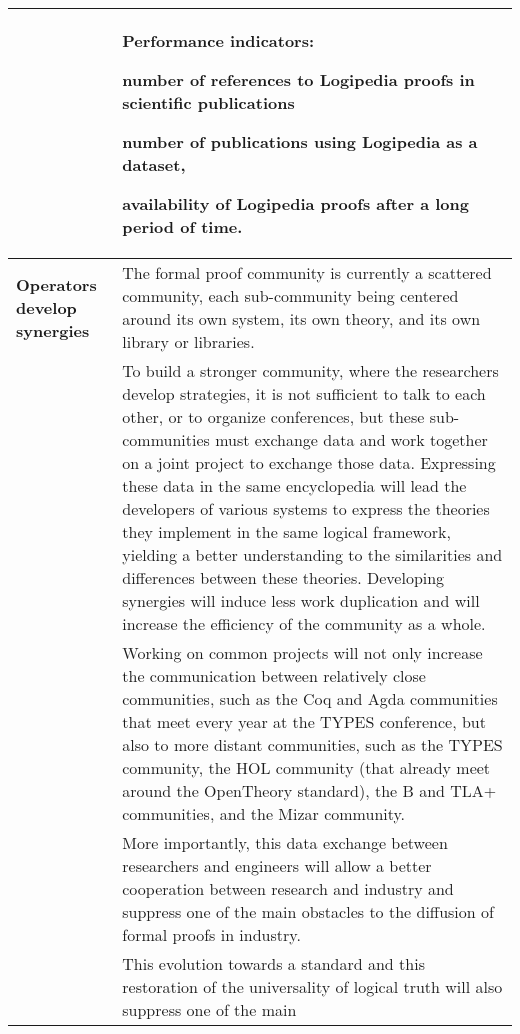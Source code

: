 \begin{longtable}{|p{}|p{}|}
\\
&
\begin{framed}
Performance indicators:
\begin{compactitem}
\item number of references to Logipedia proofs in scientific publications
\item number of publications using Logipedia as a dataset,
\item availability of Logipedia proofs after a long period of time.
\end{compactitem}
\end{framed}\\
\hline
{\bf Operators develop synergies}
&
The formal proof community is currently a scattered community, each
sub-community being centered around its own system, its own theory,
and its own library or libraries.\\
&
\hspace{0.4cm}
To build a stronger community, where the researchers develop
strategies, it is not sufficient to talk to each other, or to organize
conferences, but these sub-communities must exchange data and work
together on a joint project to exchange those data.  Expressing these
data in the same encyclopedia will lead the developers of various
systems to express the theories they implement in the same logical
framework, yielding a better understanding to the similarities and
differences between these theories.  Developing synergies will induce
less work duplication and will increase the efficiency of the
community as a whole.
\\
&
\hspace{0.4cm}
Working on common projects will not only increase the communication
between relatively close communities, such as the Coq and
  Agda communities that meet every year at the TYPES conference, but
also to more distant communities, such as the TYPES community, the HOL
community (that already meet around the OpenTheory standard),
the B and TLA+ communities, and the Mizar community.\\
&
\hspace{0.4cm}
More importantly, this data exchange between researchers and engineers
will allow a better cooperation between research and industry and
suppress one of the main obstacles to the diffusion of formal proofs
in industry.\\
&
\hspace{0.4cm}
This evolution towards a standard and this restoration of the
universality of logical truth will also suppress one of the main

\end{longtable}
